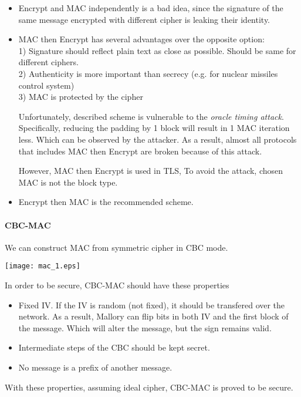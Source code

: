 \begin{itemize}
	\item Encrypt and MAC independently is a bad idea, since the signature of the same message encrypted with different cipher is leaking their identity.
	\item MAC then Encrypt has several advantages over the opposite option:\\
		1) Signature should reflect plain text as close as possible. Should be same for different ciphers.\\
		2) Authenticity is more important than secrecy (e.g. for nuclear missiles control system)\\
		3) MAC is protected by the cipher

		Unfortunately, described scheme is vulnerable to the \emph{oracle timing attack}.
		Specifically, reducing the padding by 1 block will result in 1 MAC iteration less.
		Which can be observed by the attacker. As a result, almost all protocols that includes MAC then Encrypt are broken because of this attack.

		However, MAC then Encrypt is used in TLS, To avoid the attack, chosen MAC is not the block type.
	\item Encrypt then MAC is the recommended scheme.
\end{itemize}

\paragraph{CBC-MAC}
We can construct MAC from symmetric cipher in CBC mode.

\texttt{[image: mac\_1.eps]}

\begin{properties}
In order to be secure, CBC-MAC should have these properties

\begin{itemize}
	\item Fixed IV. If the IV is random (not fixed), it should be transfered over the network.
		As a result, Mallory can flip bits in both IV and the first block of the message.
		Which will alter the message, but the sign remains valid.
	\item Intermediate steps of the CBC should be kept secret.
	\item No message is a prefix of another message.
\end{itemize}
With these properties, assuming ideal cipher, CBC-MAC is proved to be secure.
\end{properties}

